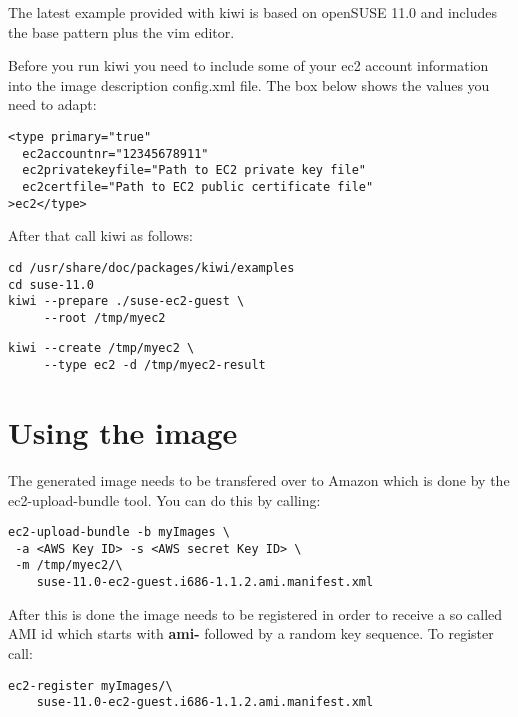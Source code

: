 The latest example provided with kiwi is based on openSUSE 11.0 and
includes the base pattern plus the vim editor.

Before you run kiwi you need to include some of your ec2 account
information into the image description config.xml file. The box
below shows the values you need to adapt:

\begin{Command}{13cm}
\begin{verbatim}
<type primary="true"
  ec2accountnr="12345678911"
  ec2privatekeyfile="Path to EC2 private key file"
  ec2certfile="Path to EC2 public certificate file"
>ec2</type>
\end{verbatim}
\end{Command}

After that call kiwi as follows:

\begin{Command}{13cm}
\begin{verbatim}
cd /usr/share/doc/packages/kiwi/examples
cd suse-11.0
kiwi --prepare ./suse-ec2-guest \
     --root /tmp/myec2
\end{verbatim}
\end{Command}

\begin{Command}{13cm}
\begin{verbatim}
kiwi --create /tmp/myec2 \
     --type ec2 -d /tmp/myec2-result
\end{verbatim}
\end{Command}

\section{Using the image}
The generated image needs to be transfered over to Amazon which is
done by the ec2-upload-bundle tool. You can do this by calling:

\begin{Command}{13cm}
\begin{verbatim}
ec2-upload-bundle -b myImages \
 -a <AWS Key ID> -s <AWS secret Key ID> \
 -m /tmp/myec2/\
    suse-11.0-ec2-guest.i686-1.1.2.ami.manifest.xml
\end{verbatim}
\end{Command}

After this is done the image needs to be registered in order to
receive a so called AMI id which starts with \textbf{ami-} followed
by a random key sequence. To register call:

\begin{Command}{13cm}
\begin{verbatim}
ec2-register myImages/\
    suse-11.0-ec2-guest.i686-1.1.2.ami.manifest.xml
\end{verbatim}
\end{Command}

